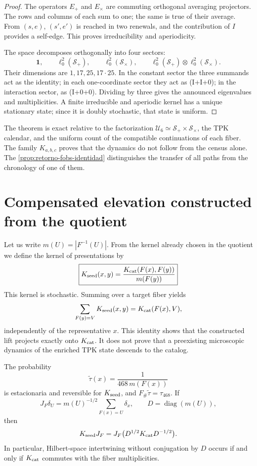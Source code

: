 \begin{proof}
The operators \(E_+\) and \(E_\times\) are commuting orthogonal
averaging projectors. The rows and columns of each sum to one; the same
is true of their average. From \((s,e)\), \((s',e')\) is reached in two
renewals, and the contribution of \(I\) provides a self-edge. This
proves irreducibility and aperiodicity.

The space decomposes orthogonally into four sectors:
\[
 \mathbf1,
 \qquad
 \ell_0^2(\mathcal S_+),
 \qquad
 \ell_0^2(\mathcal S_\times),
 \qquad
 \ell_0^2(\mathcal S_+)\otimes
 \ell_0^2(\mathcal S_\times).
\]
Their dimensions are \(1,17,25,17\cdot25\). In the constant sector
the three summands act as the identity; in each one-coordinate sector
they act as (I+I+0); in the interaction sector, as (I+0+0).
Dividing by three gives the announced eigenvalues and multiplicities. A finite
irreducible and aperiodic kernel has a unique stationary state; since it is
doubly stochastic, that state is uniform.
\end{proof}

The theorem is exact relative to the factorization
\(\mathcal U_6\simeq\mathcal S_+\times\mathcal S_\times\), the TPK
calendar, and the uniform count of the compatible continuations of each fiber. The
family \(K_{a,b,c}\) proves that the dynamics do not follow from the census
alone. The \cref{prop:retorno-fobs-identidad} distinguishes the transfer of
all paths from the chronology of one of them.

\section{Compensated elevation constructed from the quotient}

Let us write \(m(U)=|F^{-1}(U)|\). From the kernel already chosen in the quotient
we define the kernel of presentations by
\[
 \boxed{
 K_{\rm seed}(x,y)
 =\frac{K_{\rm cat}(F(x),F(y))}{m(F(y))}
 }
\]
This kernel is stochastic. Summing over a target fiber yields
\[
 \sum_{F(y)=V}K_{\rm seed}(x,y)
 =K_{\rm cat}(F(x),V),
\]
independently of the representative \(x\). This identity shows that the
constructed lift projects exactly onto \(K_{\rm cat}\). It does not prove that
a preexisting microscopic dynamics of the enriched TPK state descends
to the catalog.

\begin{theorem}
\label{thm:elevacion-reversible-cociente}
The probability
\[
 \widetilde\tau(x)
 =\frac1{468\,m(F(x))}
\]
is estacionaria and reversible for \(K_{\rm seed}\), and
\(F_\#\widetilde\tau=\tau_{468}\). If
\[
 J_F\delta_U
 =m(U)^{-1/2}\sum_{F(x)=U}\delta_x,
 \qquad
 D=\operatorname{diag}(m(U)),
\]
then
\[
 K_{\rm seed}J_F
 =J_F\bigl(D^{1/2}K_{\rm cat}D^{-1/2}\bigr).
\]
In particular, Hilbert-space intertwining without conjugation by \(D\)
occurs if and only if \(K_{\rm cat}\) commutes with the fiber
multiplicities.
\end{theorem}

